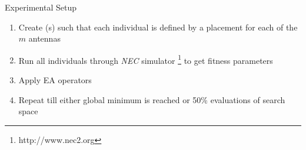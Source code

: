 \documentclass{beamer}
\begin{document}
        \begin{frame}[t]{Experimental Setup}
            \begin{enumerate}
                \item Create (s) such that each individual is defined by a placement for each of the $m$ antennas
                \item Run all individuals through \textit{NEC} simulator \footnote{http://www.nec2.org} to get fitness parameters 
                \item Apply EA operators 
                \item Repeat till either global minimum is reached or 50\% evaluations of search space 
            \end{enumerate}
            \vspace{10mm}
        \end{frame}
\end{document}
